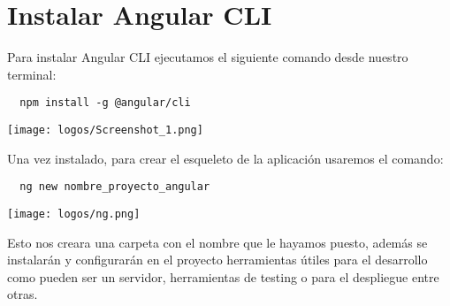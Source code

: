 \documentclass[openany]{book}
\begin{document}
\section{Instalar Angular CLI}
Para instalar Angular CLI ejecutamos el siguiente comando desde nuestro terminal:

\begin{center}
  \begin{lstlisting}
  npm install -g @angular/cli
\end{lstlisting}
  \texttt{[image: logos/Screenshot\_1.png]}
\end{center}

Una vez instalado, para crear el esqueleto de la aplicación usaremos el comando: 

\begin{center}
  \begin{lstlisting}
  ng new nombre_proyecto_angular
  \end{lstlisting}
  \texttt{[image: logos/ng.png]}
\end{center}

Esto nos creara una carpeta con el nombre que le hayamos puesto, además se instalarán y configurarán en el proyecto herramientas útiles para el desarrollo como pueden ser un servidor, herramientas de testing o para el despliegue entre otras. 
\end{document}
